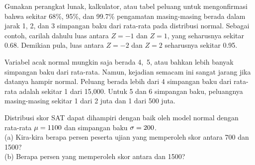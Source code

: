 \begin{exercisewrap}
\begin{nexercise}
Gunakan perangkat lunak, kalkulator, atau tabel peluang untuk
mengonfirmasi bahwa sekitar 68\%, 95\%, dan 99.7\% pengamatan
masing-masing berada dalam jarak 1, 2, dan 3 simpangan baku
dari rata-rata pada distribusi normal.
Sebagai contoh, carilah dahulu luas antara $Z=-1$ dan $Z=1$,
yang seharusnya sekitar 0.68.
Demikian pula, luas antara $Z=-2$ dan $Z=2$ seharusnya sekitar 0.95.
\footnotemark{}
\end{nexercise}
\end{exercisewrap}

Variabel acak normal mungkin saja berada 4,~5, atau bahkan lebih banyak
simpangan baku dari rata-rata.
Namun, kejadian semacam ini sangat jarang jika datanya hampir normal.
Peluang berada lebih dari 4 simpangan baku dari rata-rata adalah
sekitar 1 dari 15,000.
Untuk 5 dan 6 simpangan baku, peluangnya masing-masing sekitar
1 dari 2 juta dan 1 dari 500 juta.

\begin{exercisewrap}
\begin{nexercise}
Distribusi skor SAT dapat dihampiri dengan baik oleh model normal
dengan rata-rata $\mu = 1100{}$ dan simpangan baku
$\sigma = 200{}$.\footnotemark{} \\
(a) Kira-kira berapa persen peserta ujian yang memperoleh skor
    antara 700 dan 1500? \\
(b) Berapa persen yang memperoleh skor antara \satmean{} dan 1500?
\end{nexercise}
\end{exercisewrap}


{}




